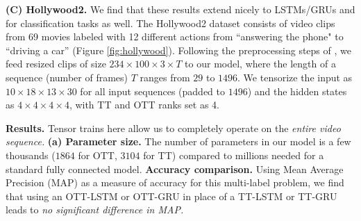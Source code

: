 \textbf{(C) Hollywood2.}
We find
    that these results extend nicely to LSTMs/GRUs and for classification tasks
    as well. The Hollywood2 dataset \cite{marszalek09} consists of video clips from 69 movies
    labeled with 12 different actions from ``answering the phone" to ``driving a car'' (Figure \ref{fig:hollywood}).
    Following the preprocessing steps of \cite{pmlr-v70-yang17e}, we feed resized
    clips of size $234 \times 100 \times 3 \times T$ to our model, where the length of a sequence
    (number of frames) $T$ ranges from $29$ to $1496$. We tensorize the
    input as $10 \times 18 \times 13 \times 30$ for all input sequences (padded to $1496$) and the
    hidden states as $4 \times 4 \times 4 \times 4$, with TT and OTT ranks set as 4.

\textbf{Results.} Tensor trains here allow us to completely operate on the \textit{entire video sequence.}
    \textbf{(a) Parameter size.}
    The number of parameters in our model is a few thousands ($1864$ for OTT, $3104$ for TT)
    compared to millions needed for a standard fully connected model.
\textbf{ Accuracy comparison.}
    Using Mean Average Precision (MAP) as a measure of accuracy for this multi-label problem, we
    find that using an OTT-LSTM or OTT-GRU in place of a TT-LSTM or TT-GRU leads to
    \textit{no significant difference in MAP.} 
	








